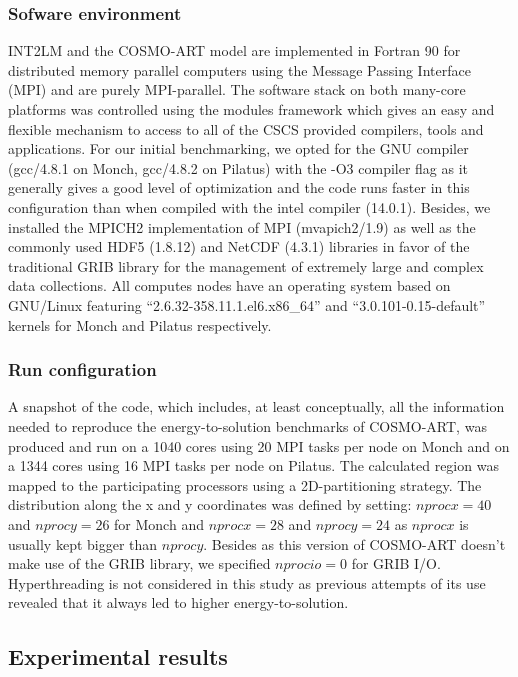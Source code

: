 \subsubsection{Sofware environment}
INT2LM  and the  COSMO-ART model  are  implemented in  Fortran 90  for
distributed  memory  parallel  computers  using  the  Message  Passing
Interface (MPI)  and are purely  MPI-parallel.  The software  stack on
both many-core  platforms was  controlled using the  modules framework
which gives  an easy and  flexible mechanism to  access to all  of the
CSCS  provided compilers,  tools  and applications.   For our  initial
benchmarking,  we opted  for  the GNU  compiler  (gcc/4.8.1 on  Monch,
gcc/4.8.2 on Pilatus) with the -O3 compiler flag as it generally gives
a  good  level  of optimization  and  the  code  runs faster  in  this
configuration  than when  compiled with  the intel  compiler (14.0.1).
Besides, we installed the  MPICH2 implementation of MPI (mvapich2/1.9)
as  well  as  the  commonly  used HDF5  (1.8.12)  and  NetCDF  (4.3.1)
libraries in favor of the  traditional GRIB library for the management
of extremely  large and complex data collections.   All computes nodes
have    an   operating   system    based   on    GNU/Linux   featuring
``2.6.32-358.11.1.el6.x86\_64''  and  ``3.0.101-0.15-default'' kernels
for Monch and Pilatus respectively.

\subsubsection{Run configuration}
A snapshot of the code, which includes, at least conceptually, all the
information needed  to reproduce the  energy-to-solution benchmarks of
COSMO-ART, was produced and run on a 1040 cores using 20 MPI tasks per
node on  Monch and  on a  1344 cores using  16 MPI  tasks per  node on
Pilatus.   The  calculated  region  was mapped  to  the  participating
processors using  a 2D-partitioning strategy.   The distribution along
the  x and  y  coordinates  was defined  by  setting: $nprocx=40$  and
$nprocy=26$ for  Monch and $nprocx=28$ and $nprocy=24$  as $nprocx$ is
usually  kept  bigger  than  $nprocy$.   Besides as  this  version  of
COSMO-ART  doesn't  make  use   of  the  GRIB  library,  we  specified
$nprocio=0$ for  GRIB I/O.  Hyperthreading  is not considered  in this
study as previous  attempts of its use revealed that  it always led to
higher energy-to-solution.\\

\subsection{Experimental results}
\label{subsec:4.3}

